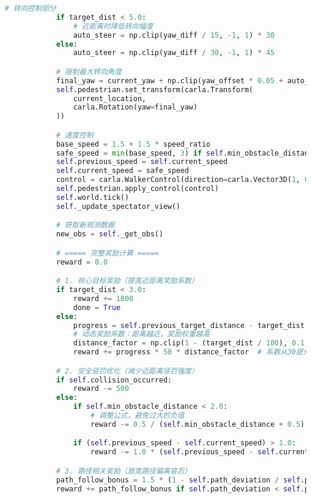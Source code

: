 \begin{lstlisting}[language=Python]
            # 转向控制部分
            if target_dist < 5.0:
                # 近距离时降低转向幅度
                auto_steer = np.clip(yaw_diff / 15, -1, 1) * 30
            else:
                auto_steer = np.clip(yaw_diff / 30, -1, 1) * 45

            # 限制最大转向角度
            final_yaw = current_yaw + np.clip(yaw_offset * 0.05 + auto_steer, -45, 45)
            self.pedestrian.set_transform(carla.Transform(
                current_location,
                carla.Rotation(yaw=final_yaw)
            ))

            # 速度控制
            base_speed = 1.5 + 1.5 * speed_ratio
            safe_speed = min(base_speed, 3) if self.min_obstacle_distance > 2 else 0.8
            self.previous_speed = self.current_speed
            self.current_speed = safe_speed
            control = carla.WalkerControl(direction=carla.Vector3D(1, 0, 0), speed=safe_speed)
            self.pedestrian.apply_control(control)
            self.world.tick()
            self._update_spectator_view()

            # 获取新观测数据
            new_obs = self._get_obs()

            # ===== 完整奖励计算 =====
            reward = 0.0

            # 1. 核心目标奖励（提高近距离奖励系数）
            if target_dist < 3.0:
                reward += 1000
                done = True
            else:
                progress = self.previous_target_distance - target_dist
                # 动态奖励系数：距离越近，奖励权重越高
                distance_factor = np.clip(1 - (target_dist / 100), 0.1, 1.0)
                reward += progress * 50 * distance_factor  # 系数从30提升至50，并加入距离因子

            # 2. 安全惩罚优化（减少近距离惩罚强度）
            if self.collision_occurred:
                reward -= 500
            else:
                if self.min_obstacle_distance < 2.0:
                    # 调整公式，避免过大的负值
                    reward -= 0.5 / (self.min_obstacle_distance + 0.5)  # 原为1.5/(d+0.1)

                if (self.previous_speed - self.current_speed) > 1.0:
                    reward -= 1.0 * (self.previous_speed - self.current_speed)  # 惩罚减半

            # 3. 路径相关奖励（放宽路径偏离容忍）
            path_follow_bonus = 1.5 * (1 - self.path_deviation / self.path_radius)  # 系数从1.0提升至1.5
            reward += path_follow_bonus if self.path_deviation < self.path_radius else -1.0  # 惩罚从-3.0减至-1.0


\end{lstlisting}
